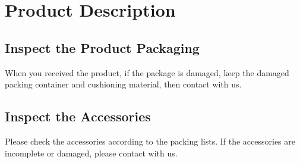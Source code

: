\chapter{\heiti Product Description}
{
\fancyhf{}
\renewcommand{\headrulewidth}{2.4pt}
\renewcommand{\footrulewidth}{2.4pt}
\chead{}
\cfoot{}
\fancyfoot[RO,LE]{\xiaosi\textbf{\thepage}}
}


\pagestyle{fancy}
\renewcommand{\headrulewidth}{1.5pt}
\renewcommand{\footrulewidth}{1.5pt}
\chead{}
\cfoot{}
\fancyfoot[RO,LE]{\xiaosi\textbf{\thepage}}

\setcounter{page}{1}
\setmainfont{Times New Roman}
\section{Inspect the Product Packaging}
\hspace{-0.2cm}When you received the product, if the package is damaged, keep the damaged packing container and cushioning material, then contact with us.

\section{\heiti Inspect the Accessories}
\hspace{-0.2cm}Please check the accessories according to the packing lists. If the accessories are incomplete or damaged, please contact with us.

